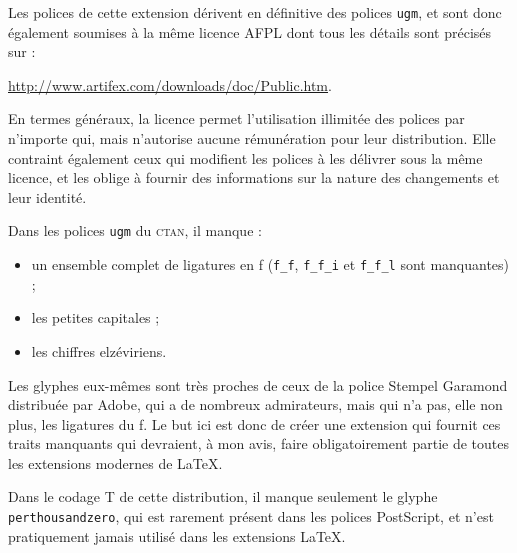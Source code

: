 \documentclass[12pt,english,french]{article}
\newcommand{\mnu}[1]{\texttt{#1}}
\begin{document}
Les polices de cette extension dérivent en définitive des polices \texttt{ugm}, et sont donc également soumises à la même licence AFPL dont tous les détails sont précisés sur :

\noindent\url{http://www.artifex.com/downloads/doc/Public.htm}.

En termes généraux, la licence permet l'utilisation illimitée des polices par n'importe qui, mais n'autorise aucune rémunération pour leur distribution. Elle contraint également ceux qui modifient les polices à les délivrer sous la même licence, et les oblige à fournir des informations sur la nature des changements et leur identité.


Dans les polices \texttt{ugm} du \textsc{ctan}, il manque :

\begin{itemize}
\item 
un ensemble complet de ligatures en f (\verb+f_f+, \verb+f_f_i+ et \verb+f_f_l+ sont manquantes) ;

\item
les petites capitales ;
\item
les chiffres elzéviriens.
\end{itemize}

Les glyphes eux-mêmes sont très proches de ceux de la police Stempel Garamond distribuée par Adobe, qui a de nombreux admirateurs, mais qui n'a pas, elle non plus, les ligatures du f. Le but ici est donc de créer une extension qui fournit ces traits manquants qui devraient, à mon avis, faire obligatoirement partie de toutes les extensions modernes de \LaTeX.

Dans le codage T de cette distribution, il manque seulement le glyphe \mnu{perthousandzero}, qui est rarement présent dans les polices PostScript, et n'est pratiquement jamais utilisé dans les extensions \LaTeX.
\end{document}
